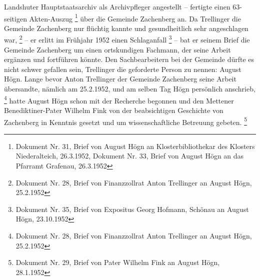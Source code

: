 Landshuter Hauptstaatsarchiv als Archivpfleger angestellt – fertigte
einen 63-seitigen Akten-Auszug \footnote{Dokument Nr. 31, Brief von
August Högn an Klosterbibliothekar des Klosters Niederalteich,
26.3.1952, Dokument Nr. 33, Brief von August Högn an das Pfarramt
Grafenau, 26.3.1952} über die Gemeinde Zachenberg an. Da Trellinger die
Gemeinde Zachenberg nur flüchtig kannte und gesundheitlich sehr
angeschlagen war, \footnote{Dokument Nr. 28, Brief von Finanzzollrat
Anton Trellinger an August Högn, 25.2.1952} – er erlitt im Frühjahr
1952 einen Schlaganfall \footnote{Dokument Nr. 35, Brief von Expositus
Georg Hofmann, Schönau an August Högn, 23.10.1952} – bat er seinem
Brief die Gemeinde Zachenberg um einen ortskundigen Fachmann, der seine
Arbeit ergänzen und fortführen könnte. Den Sachbearbeitern bei der
Gemeinde dürfte es nicht schwer gefallen sein, Trellinger die
geforderte Person zu nennen: August Högn. Lange bevor Anton Trellinger
der Gemeinde Zachenberg seine Arbeit übersandte, nämlich am 25.2.1952,
und am selben Tag Högn persönlich anschrieb, \footnote{Dokument Nr. 28,
Brief von Finanzzollrat Anton Trellinger an August Högn, 25.2.1952}
hatte August Högn schon mit der Recherche begonnen und den Mettener
Benediktiner-Pater Wilhelm Fink von der beabsichtigen Geschichte von
Zachenberg in Kenntnis gesetzt und um wissenschaftliche Betreuung
gebeten. \footnote{Dokument Nr. 29, Brief von Pater Wilhelm Fink an
August Högn, 28.1.1952}

